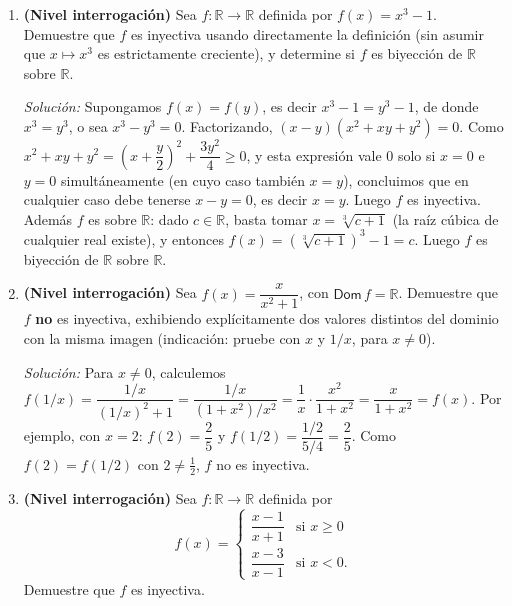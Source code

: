 \documentclass[11pt]{article}
\begin{document}
\begin{enumerate}[label=\arabic*.]
\textit{Solución:} $\mathsf{Dom}\,f=\mathbb{R}-\{4\}$. Si $f(x)=f(y)$:
$(2x+1)(y-4)=(2y+1)(x-4)$, es decir $2xy-8x+y-4=2xy-8y+x-4$, de donde $-9x=-9y$, o sea $x=y$: $f$
es inyectiva. Despejando de $y=\dfrac{2x+1}{x-4}$: $y(x-4)=2x+1 \Rightarrow x(y-2)=1+4y
\Rightarrow x=\dfrac{4y+1}{y-2}$, expresión definida solo si $y\neq2$ (en efecto, $f(x)=2$
llevaría a $2x+1=2x-8$, es decir $1=-8$, lo cual es falso, así que $2$ nunca es alcanzado). Luego
$\mathsf{Rec}\,f=\mathbb{R}-\{2\}$ y $f^{-1}(y)=\dfrac{4y+1}{y-2}$.

\item \textbf{(Nivel interrogación)} Sea $f:\mathbb{R}\to\mathbb{R}$ definida por
$f(x)=x^3-1$. Demuestre que $f$ es inyectiva usando directamente la definición (sin asumir que
$x\mapsto x^3$ es estrictamente creciente), y determine si $f$ es biyección de $\mathbb{R}$ sobre
$\mathbb{R}$.

\textit{Solución:} Supongamos $f(x)=f(y)$, es decir $x^3-1=y^3-1$, de donde $x^3=y^3$, o sea
$x^3-y^3=0$. Factorizando, $(x-y)(x^2+xy+y^2)=0$. Como
$x^2+xy+y^2 = \left(x+\dfrac{y}{2}\right)^2+\dfrac{3y^2}{4} \ge 0$, y esta expresión vale $0$ solo
si $x=0$ e $y=0$ simultáneamente (en cuyo caso también $x=y$), concluimos que en cualquier caso
debe tenerse $x-y=0$, es decir $x=y$. Luego $f$ es inyectiva. Además $f$ es sobre $\mathbb{R}$:
dado $c\in\mathbb{R}$, basta tomar $x=\sqrt[3]{c+1}$ (la raíz cúbica de cualquier real existe),
y entonces $f(x)=(\sqrt[3]{c+1})^3-1=c$. Luego $f$ es biyección de $\mathbb{R}$ sobre $\mathbb{R}$.

\item \textbf{(Nivel interrogación)} Sea $f(x) = \dfrac{x}{x^2+1}$, con $\mathsf{Dom}\,f =
\mathbb{R}$. Demuestre que $f$ \textbf{no} es inyectiva, exhibiendo explícitamente dos valores
distintos del dominio con la misma imagen (indicación: pruebe con $x$ y $1/x$, para $x\neq0$).

\textit{Solución:} Para $x\neq0$, calculemos $f(1/x) = \dfrac{1/x}{(1/x)^2+1} =
\dfrac{1/x}{(1+x^2)/x^2} = \dfrac{1}{x}\cdot\dfrac{x^2}{1+x^2} = \dfrac{x}{1+x^2} = f(x)$. Por
ejemplo, con $x=2$: $f(2) = \dfrac{2}{5}$ y $f(1/2) = \dfrac{1/2}{5/4} = \dfrac{2}{5}$. Como
$f(2)=f(1/2)$ con $2\neq \tfrac12$, $f$ no es inyectiva.

\item \textbf{(Nivel interrogación)} Sea $f:\mathbb{R}\to\mathbb{R}$ definida por
\[
f(x) = \begin{cases} \dfrac{x-1}{x+1} & \text{si } x \ge 0 \\[2mm] \dfrac{x-3}{x-1} & \text{si } x < 0. \end{cases}
\]
Demuestre que $f$ es inyectiva.


\end{enumerate}
\end{document}
